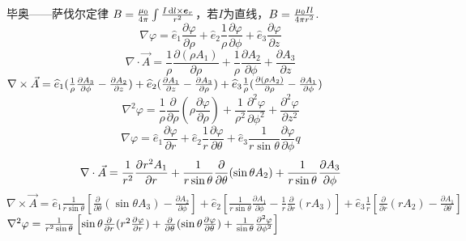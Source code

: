 \documentclass[UTF8,8pt]{ctexart}
\begin{document}
\begin{multicols}{3}
    毕奥——萨伐尔定律  $B=\frac{\mu_0}{4\pi}\int\frac{I\d l\times \bm{e}_r}{r^2}$，若$I$为直线，$B=\f{\mu_0Il}{4\pi r^2}$.
    $$\nabla \varphi = \hat e_1 \frac { \partial \varphi } { \partial \rho } + \hat e_2 \frac { 1 } { \rho } \frac { \partial \varphi } { \partial \phi } + \hat { e } _ { 3 } \frac { \partial \varphi } { \partial z }$$
    $$\nabla \cdot \vec { A } = \frac { 1 } { \rho } \frac { \partial ( \rho A _ { 1 } ) } { \partial \rho } + \frac { 1 } { \rho } \frac { \partial A _ { 2 } } { \partial \phi } + \frac { \partial A _ { 3 } } { \partial z }$$
    $ { \nabla \times \vec { A } } =\hat e_1 (\ff{\rho} \frac { \partial A_3} { \partial \phi } - \frac { \partial A _ { 2 } } { \partial z } ) + \hat { e } _ { 2 } ( \frac { \partial A _ { 1 } } { \partial z } - \frac { \partial A _ { 3 } } { \partial \rho } ) + \hat { e } _ { 3 } \frac { 1 } { \rho } ( \frac { \partial ( \rho A _ { 2 } ) } { \partial \rho } - \frac { \partial A _ { 1 } } { \partial \phi } )$
    $$\nabla ^ { 2 } \varphi = \frac { 1 } { \rho } \frac { \partial } { \partial \rho } ( \rho \frac { \partial \varphi } { \partial \rho } ) + \frac { 1 } { \rho ^ { 2 } } \frac { \partial ^ { 2 } \varphi } { \partial \phi ^ { 2 } } + \frac { \partial ^ { 2 } \varphi } { \partial z ^ { 2 } }$$
    $$\nabla \varphi = \hat { e } _ { 1 } \frac { \partial \varphi } { \partial r } + \hat { e } _ { 2 } \frac { 1 } { r } \frac { \partial \varphi } { \partial \theta } + \hat { e } _ { 3 } \frac { 1 } { r \sin \theta } \frac { \partial \varphi } { \partial \phi }q$$
    $$\nabla \cdot \vec { A } = \ff{r^2} \pp{r^2A_1}{r} + \frac { 1 } { r \sin \theta } \frac { \partial } { \partial \theta } ( \sin \theta A _ { 2 } ) + \frac { 1 } { r \sin \theta } \frac { \partial A _ { 3 } } { \partial \phi }$$
    $\nabla \times \vec { A }  = \hat { e } _ { 1 } \frac { 1 } { r \sin \theta } \left[ \frac { \partial } { \partial \theta } ( \sin \theta A _ { 3 } ) - \frac { \partial A _ { 2 } } { \partial \phi } \right]  
    + \hat { e } _ { 2 } \left[ \frac { 1 } { r \sin \theta } \frac { \partial A _ { 1 } } { \partial \phi } - \frac { 1 } { r } \frac { \partial } { \partial r } ( r A _ { 3 } ) \right] 
    + \hat { e } _ { 3 } \frac { 1 } { r } \left[ \frac { \partial } { \partial r } ( r A _ { 2 } ) - \frac { \partial A _ { 1 } } { \partial \theta } \right] $
    $\nabla^2\varphi=\ff{r^2\sin\t}\left[\sin\t\pp{}{r}(r^2\pp{\varphi}{r})+\pp{}{\t}(\sin\t\pp{\varphi}{\t})+\ff{\sin\t}\pp[2]{\varphi}{\phi}\right]$

\end{multicols}
\end{document}
